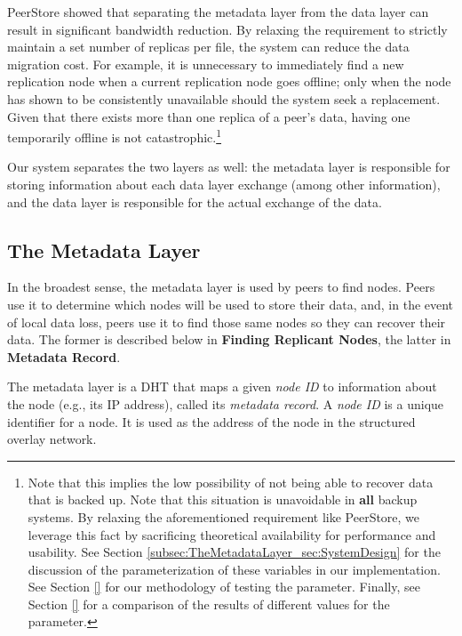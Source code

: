 \documentclass[12pt]{report}
\begin{document}
PeerStore showed that separating the metadata layer from the data layer can result in significant bandwidth reduction. By relaxing the requirement to strictly maintain a set number of replicas per file, the system can reduce the data migration cost. For example, it is unnecessary to immediately find a new replication node when a current replication node goes offline; only when the node has shown to be consistently unavailable should the system seek a replacement. Given that there exists more than one replica of a peer's data, having one temporarily offline is not catastrophic.\footnote{Note that this implies the low possibility of not being able to recover data that is backed up. Note that this situation is unavoidable in \textbf{all} backup systems. By relaxing the aforementioned requirement like PeerStore, we leverage this fact by sacrificing theoretical availability for performance and usability. See Section \ref{subsec:TheMetadataLayer_sec:SystemDesign} for the discussion of the parameterization of these variables in our implementation. See Section \ref{} for our methodology of testing the parameter. Finally, see Section \ref{} for a comparison of the results of different values for the parameter.}

Our system separates the two layers as well: the metadata layer is responsible for storing information about each data layer exchange (among other information), and the data layer is responsible for the actual exchange of the data.

\subsection{The Metadata Layer} \label{sec:TheMetadataLayer_DataExchange}

In the broadest sense, the metadata layer is used by peers to find nodes. Peers use it to determine which nodes will be used to store their data, and, in the event of local data loss, peers use it to find those same nodes so they can recover their data. The former is described below in \textbf{Finding Replicant Nodes}, the latter in \textbf{Metadata Record}.

The metadata layer is a DHT that maps a given \textit{node ID} to information about the node (e.g., its IP address), called its \textit{metadata record}. A \textit{node ID} is a unique identifier for a node. It is used as the address of the node in the structured overlay network.
\end{document}

